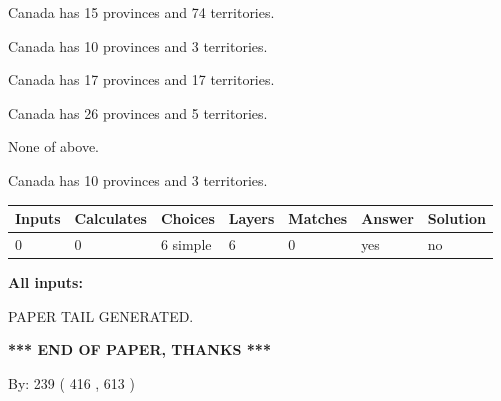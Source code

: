\documentclass[12pt]{article}
\begin{document}
 
Canada has  15 provinces and  74 territories.
 
 
Canada has 10  provinces and 3 territories.
 
 
Canada has  17 provinces and  17 territories.
 
 
Canada has  26 provinces and  5 territories.
 
 
 None of above.
 
 
\noindent{}
 
 
Canada has 10  provinces and 3 territories.
 
 
\noindent{}
 
 
   
   
   
   
\noindent\begin{tabular}{|l|l|l|l|l|l|l|}
 \hline
Inputs & Calculates & Choices & Layers & Matches & Answer & Solution \\ \hline
 0  & 
 0  & 
 6
  simple  
  & 
 6  & 
 0  & 
  yes & 
  no 
  \\ \hline
 \end{tabular}
   
   
   
   
\noindent{}
   
   
   
   
\noindent\vspace{0.1in}\hspace{-0.08in} {\textbf{\Large{All inputs: }}}
   
   
   
   
   
   
 \vspace{0.2in}
 
   
   
\vspace{2.0in} PAPER TAIL GENERATED.
   
   
   
   
\vspace{1.0in} 
{\textbf{\large{ *** END OF PAPER, THANKS *** }}} 
   
   
\hspace{1.0in} By: 
 239 ( 416 ,  613 )
   
\end{document}
